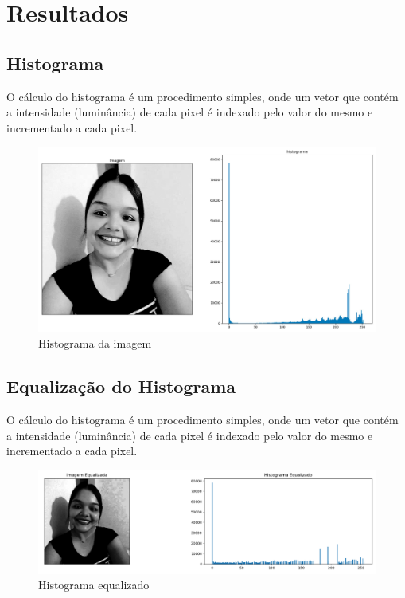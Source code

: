 \newpage
\section{Resultados}
	\subsection{Histograma}
		O cálculo do histograma é um procedimento simples, onde um vetor que contém a intensidade (luminância)  de cada pixel é indexado pelo valor do mesmo e incrementado a cada pixel.
		
		\begin{figure}[!htb]
			\centering
			\includegraphics[width=\textwidth]{img/01-hist.jpg}
			\caption{Histograma da imagem}
		\end{figure}
	
		\lstset{language=c++}
		{\tiny }
		
	\subsection{Equalização do Histograma}
		O cálculo do histograma é um procedimento simples, onde um vetor que contém a intensidade (luminância)  de cada pixel é indexado pelo valor do mesmo e incrementado a cada pixel.
		
		\begin{figure}[!htb]
			\centering
			\includegraphics[width=\textwidth]{img/02-eq-hist.png}
			\caption{Histograma equalizado}
		\end{figure}
		
